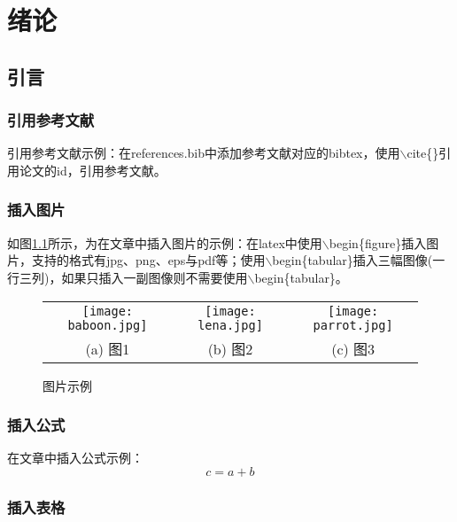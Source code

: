 
\chapter{绪论}

\section{引言}

\subsection{引用参考文献}
引用参考文献示例：在references.bib中添加参考文献对应的bibtex，使用$\backslash$cite\{\}引用论文的id，引用参考文献\cite{barnes2009patchmatch}。

\subsection{插入图片}
如图\ref{fig:figure1}所示，为在文章中插入图片的示例：在latex中使用$\backslash$begin\{figure\}插入图片，支持的格式有jpg、png、eps与pdf等；使用$\backslash$begin\{tabular\}插入三幅图像(一行三列)，如果只插入一副图像则不需要使用$\backslash$begin\{tabular\}。

\begin{figure}[htb]
	\centering
	\setlength\tabcolsep{3pt}  %
	\vspace{5pt} %
	\begin{tabular}{ccc}
		\texttt{[image: baboon.jpg]} &
		\texttt{[image: lena.jpg]} &
		\texttt{[image: parrot.jpg]} \\
		(a) 图1 & (b) 图2 & (c) 图3 \\[1ex]
	\end{tabular}
	\caption{图片示例}
	\label{fig:figure1}
\end{figure}

\subsection{插入公式}
在文章中插入公式示例：
\begin{equation}
	c = a + b
	\label{eq:equation1}
\end{equation}

\subsection{插入表格}

